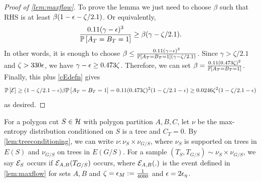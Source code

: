 \begin{proof}[Proof of \cref{lem:maxflow}]
	To prove the lemma we just need to choose $\beta$ such that RHS is at least $\beta(1-\eps-\zeta/2.1)$. Or equivalently,
	$$ \frac{0.11(\gamma-\eps)^3}{\P{A_T=B_T=1}} \geq \beta(\gamma-\zeta/2.1).$$
	In other words, it is enough to choose $\beta \leq \frac{0.11(\gamma-\eps)^3}{\P{A_T=B_T=1}(\gamma-\zeta/2.1)}$. Since $\gamma > \zeta/2.1$ and $\zeta>330\eps$, we have $\gamma-\eps \geq 0.473\zeta$. Therefore, we can set $\beta=\frac{0.11(0.473\zeta)^2}{\P{A_T=B_T=1}}$. Finally, this plus \eqref{cEdefn} gives
	$$ \P{\cE} \geq (1-\zeta/2.1-\eps)\beta \P{A_T=B_T=1} = 0.11(0.473\zeta)^2(1-\zeta/2.1-\eps) \ge 0.0246\zeta^2(1-\zeta/2.1-\eps)$$
	as desired.
%	
%
\end{proof}

\begin{definition}\label{def:max-flow-event}
\hypertarget{tar:max-flow-event}{For a polygon cut $S\in\cH$ with polygon partition  $A,B,C$, let $\nu$ be the max-entropy distribution conditioned on $S$ is a tree and $C_T=0$. By \cref{lem:treeconditioning}, we can write $\nu: \nu_{S} \times \nu_{G/S}$, where $\nu_S$ is supported on trees in $E(S)$ and $\nu_{G/S}$ on trees in $E(G/S)$.
	For a sample $(T_S,T_{G/S})\sim \nu_S\times \nu_{G/S}$, we say $\cE_S$ occurs if  $\cE_{A,B}(T_{G/S})$ occurs, where $\cE_{A,B}(.)$ is the event defined in \cref{lem:maxflow} for sets $A,B$ and $\zeta=\eps_M:=\frac1{4000}$ and $\eps=2\eps_\eta$. }
\end{definition}

